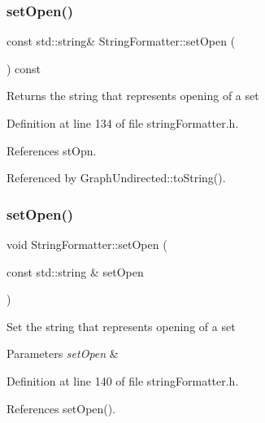 \subsubsection{\texorpdfstring{set\+Open()}{setOpen()}\hspace{0.1cm}{\footnotesize\ttfamily [1/2]}}
{\footnotesize\ttfamily const std\+::string\& String\+Formatter\+::set\+Open (\begin{DoxyParamCaption}{ }\end{DoxyParamCaption}) const\hspace{0.3cm}{\ttfamily [inline]}}

\begin{DoxyReturn}{Returns}
the string that represents opening of a set 
\end{DoxyReturn}


Definition at line 134 of file string\+Formatter.\+h.



References st\+Opn.



Referenced by Graph\+Undirected\+::to\+String().

\mbox{\label{classStringFormatter_ad477eddfe41eb425ddd1b13051d838b9}} 
\subsubsection{\texorpdfstring{set\+Open()}{setOpen()}\hspace{0.1cm}{\footnotesize\ttfamily [2/2]}}
{\footnotesize\ttfamily void String\+Formatter\+::set\+Open (\begin{DoxyParamCaption}\item[{const std\+::string \&}]{set\+Open }\end{DoxyParamCaption})\hspace{0.3cm}{\ttfamily [inline]}}

Set the string that represents opening of a set 
\begin{DoxyParams}{Parameters}
{\em set\+Open} & \\
\hline
\end{DoxyParams}


Definition at line 140 of file string\+Formatter.\+h.



References set\+Open().



